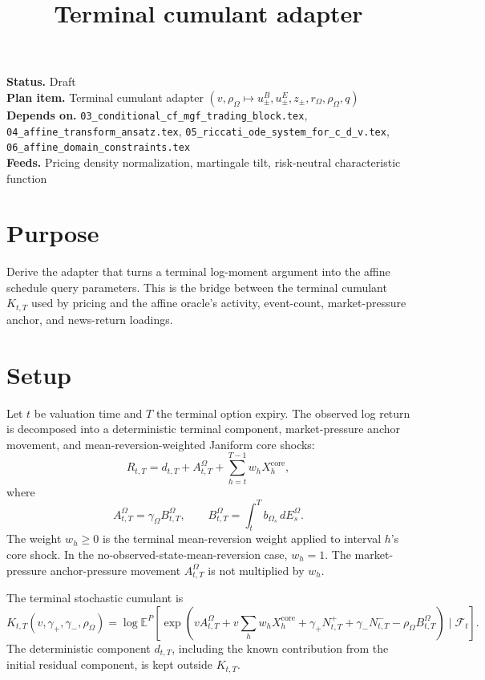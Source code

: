 \documentclass[11pt]{article}
\title{Terminal cumulant adapter}
\author{}
\date{}
\begin{document}
\maketitle

\noindent\textbf{Status.} Draft\\
\textbf{Plan item.} Terminal cumulant adapter
\((v,\rho_\Omega\mapsto u_\pm^B,u_\pm^E,z_\pm,r_\Omega,\rho_\Omega,q)\)\\
\textbf{Depends on.} \texttt{03\_conditional\_cf\_mgf\_trading\_block.tex},
\texttt{04\_affine\_transform\_ansatz.tex},
\texttt{05\_riccati\_ode\_system\_for\_c\_d\_v.tex},
\texttt{06\_affine\_domain\_constraints.tex}\\
\textbf{Feeds.} Pricing density normalization, martingale tilt, risk-neutral characteristic function

\section{Purpose}

Derive the adapter that turns a terminal log-moment argument into the affine
schedule query parameters.
This is the bridge between the terminal cumulant \(K_{t,T}\) used by pricing and
the affine oracle's activity, event-count, market-pressure anchor, and
news-return loadings.

\section{Setup}

Let \(t\) be valuation time and \(T\) the terminal option expiry.
The observed log return is decomposed into a deterministic terminal component,
market-pressure anchor movement, and mean-reversion-weighted Janiform core
shocks:
\[
    R_{t,T}
    =
    d_{t,T}
    +
    A_{t,T}^{\Omega}
    +
    \sum_{h=t}^{T-1} w_h X_h^{\mathrm{core}},
\]
where
\[
    A_{t,T}^{\Omega}
    =
    \gamma_\Omega B_{t,T}^{\Omega},
    \qquad
    B_{t,T}^{\Omega}
    =
    \int_t^T b_{\Omega_s}\,dE_s^\Omega.
\]
The weight \(w_h\ge0\) is the terminal mean-reversion weight applied to interval
\(h\)'s core shock.
In the no-observed-state-mean-reversion case, \(w_h=1\).
The market-pressure anchor-pressure movement \(A_{t,T}^{\Omega}\) is
not multiplied by \(w_h\).

The terminal stochastic cumulant is
\[
    K_{t,T}(v,\gamma_+,\gamma_-,\rho_\Omega)
    =
    \log\mathbb E^P\!\left[
        \exp\!\left(
            vA_{t,T}^{\Omega}
            +v\sum_h w_h X_h^{\mathrm{core}}
            +\gamma_+N_{t,T}^+
            +\gamma_-N_{t,T}^-
            -\rho_\Omega B_{t,T}^{\Omega}
        \right)
        \mid\mathcal F_t
    \right].
\]
The deterministic component \(d_{t,T}\), including the known contribution from
the initial residual component, is kept outside \(K_{t,T}\).
\end{document}

